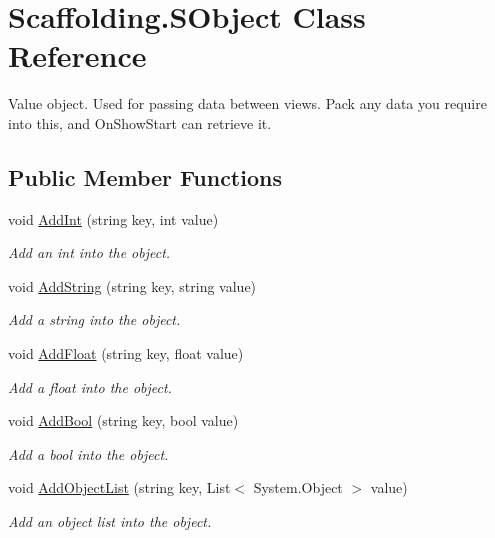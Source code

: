 \hypertarget{class_scaffolding_1_1_s_object}{\section{Scaffolding.\-S\-Object Class Reference}
\label{class_scaffolding_1_1_s_object}
}


Value object. Used for passing data between views. Pack any data you require into this, and On\-Show\-Start can retrieve it.  


\subsection*{Public Member Functions}
\begin{DoxyCompactItemize}
\item 
void \hyperlink{class_scaffolding_1_1_s_object_a85026a282f20ae9319fcbbc8894a0cf0}{Add\-Int} (string key, int value)
\begin{DoxyCompactList}\small\item\em Add an int into the object. \end{DoxyCompactList}\item 
void \hyperlink{class_scaffolding_1_1_s_object_aa6d9e75007547ef7feb0047ae6458edb}{Add\-String} (string key, string value)
\begin{DoxyCompactList}\small\item\em Add a string into the object. \end{DoxyCompactList}\item 
void \hyperlink{class_scaffolding_1_1_s_object_aabbaa83927a45116a89103ddac5d3242}{Add\-Float} (string key, float value)
\begin{DoxyCompactList}\small\item\em Add a float into the object. \end{DoxyCompactList}\item 
void \hyperlink{class_scaffolding_1_1_s_object_a6a595710bc12e94c5c5c696bb0b98b85}{Add\-Bool} (string key, bool value)
\begin{DoxyCompactList}\small\item\em Add a bool into the object. \end{DoxyCompactList}\item 
void \hyperlink{class_scaffolding_1_1_s_object_a3fea64b340f46919191c1bc8acefa0ad}{Add\-Object\-List} (string key, List$<$ System.\-Object $>$ value)
\begin{DoxyCompactList}\small\item\em Add an object list into the object. \end{DoxyCompactList}\item 

\end{DoxyCompactItemize}
